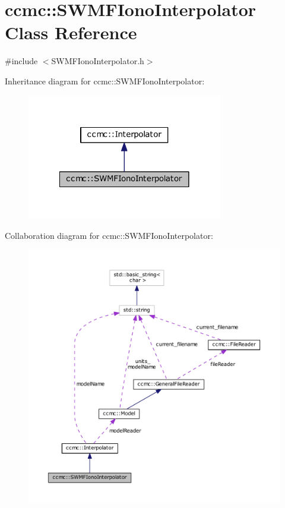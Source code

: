 \hypertarget{classccmc_1_1_s_w_m_f_iono_interpolator}{\section{ccmc\-:\-:S\-W\-M\-F\-Iono\-Interpolator Class Reference}
\label{classccmc_1_1_s_w_m_f_iono_interpolator}
}


{\ttfamily \#include $<$S\-W\-M\-F\-Iono\-Interpolator.\-h$>$}



Inheritance diagram for ccmc\-:\-:S\-W\-M\-F\-Iono\-Interpolator\-:
\nopagebreak
\begin{figure}[H]
\begin{center}
\leavevmode
\includegraphics[width=242pt]{classccmc_1_1_s_w_m_f_iono_interpolator__inherit__graph}
\end{center}
\end{figure}


Collaboration diagram for ccmc\-:\-:S\-W\-M\-F\-Iono\-Interpolator\-:
\nopagebreak
\begin{figure}[H]
\begin{center}
\leavevmode
\includegraphics[width=350pt]{classccmc_1_1_s_w_m_f_iono_interpolator__coll__graph}
\end{center}
\end{figure}
